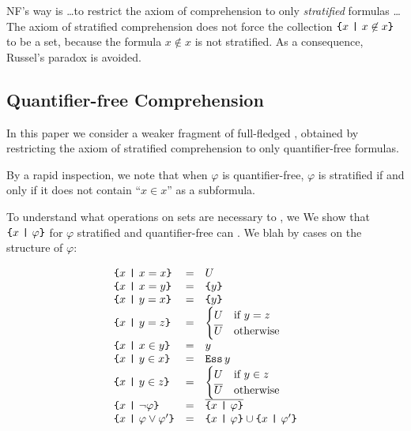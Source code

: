 \documentclass[sigplan,10pt,anonymous,review]{acmart}\settopmatter{printfolios=true,printccs=false,printacmref=false}
\begin{document}
NF's way is \dots to restrict the axiom of comprehension to only \emph{stratified} formulas \ldots
The axiom of stratified comprehension does not force the collection $\text{\texttt{\{}} x ~\text{\texttt{|}}~ x \not\in x \text{\texttt{\}}}$ to be a set, because the formula $x \not\in x$ is not stratified. As a consequence, Russel's paradox is avoided.

\subsection{Quantifier-free Comprehension}

In this paper we consider a weaker fragment of full-fledged \NF{}, obtained by restricting the axiom of stratified comprehension to only quantifier-free formulas.



By a rapid inspection, we note that when $\varphi$ is quantifier-free, $\varphi$ is stratified if and only if it does not contain ``$x \in x$'' as a subformula.

To understand what operations on sets are necessary to , we 
We show that $\text{\texttt{\{}} x ~\text{\texttt{|}}~ \varphi \text{\texttt{\}}}$ for $\varphi$ stratified and quantifier-free can . We blah by cases on the structure of $\varphi$:

\[\begin{array}{lcll}
  \text{\texttt{\{}} x ~\text{\texttt{|}}~ x = x \text{\texttt{\}}} & = & U \\
  \text{\texttt{\{}} x ~\text{\texttt{|}}~ x = y \text{\texttt{\}}} & = & \text{\texttt{\{}} y \text{\texttt{\}}} \\
  \text{\texttt{\{}} x ~\text{\texttt{|}}~ y = x \text{\texttt{\}}} & = & \text{\texttt{\{}} y \text{\texttt{\}}} \\
  \text{\texttt{\{}} x ~\text{\texttt{|}}~ y = z \text{\texttt{\}}} & = &
    \begin{cases}
      U & \text{if } y = z\\
      \overline{U} & \text{otherwise}
    \end{cases}\\
  \text{\texttt{\{}} x ~\text{\texttt{|}}~ x \in y \text{\texttt{\}}} & = & y \\
  \text{\texttt{\{}} x ~\text{\texttt{|}}~ y \in x \text{\texttt{\}}} & = & \text{\texttt{Ess}}\,y \\
  \text{\texttt{\{}} x ~\text{\texttt{|}}~ y \in z \text{\texttt{\}}} & = &
    \begin{cases}
      U & \text{if } y \in z\\
      \overline{U} & \text{otherwise}
    \end{cases}\\
  \text{\texttt{\{}} x ~\text{\texttt{|}}~ \neg\varphi \text{\texttt{\}}} & = & \overline{\text{\texttt{\{}} x ~\text{\texttt{|}}~ \varphi \text{\texttt{\}}}} \\
  \text{\texttt{\{}} x ~\text{\texttt{|}}~ \varphi \lor \varphi' \text{\texttt{\}}} & = & \text{\texttt{\{}} x ~\text{\texttt{|}}~ \varphi \text{\texttt{\}}} \cup \text{\texttt{\{}} x ~\text{\texttt{|}}~ \varphi' \text{\texttt{\}}} \\
\end{array}\]
\end{document}
